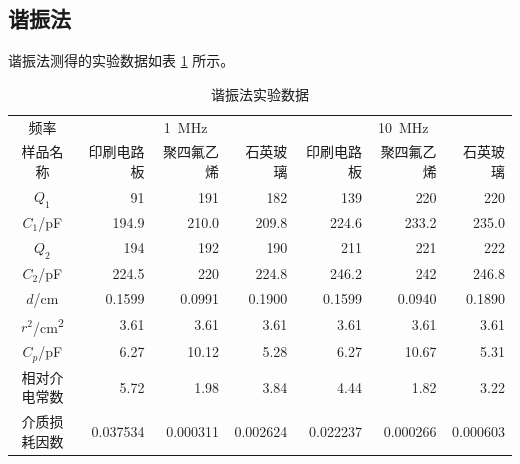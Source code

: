 \subsection{谐振法}
谐振法测得的实验数据如表 \ref{tab:A12.xiezhen} 所示。
\begin{table}[!ht]
    \caption{谐振法实验数据} \label{tab:A12.xiezhen}
    \begin{tabular}{c*{6}{r}} \toprule
        频率 & \multicolumn{3}{c}{\SI{1}{\MHz}} & \multicolumn{3}{c}{\SI{10}{\MHz}} \\
        样品名称 & 印刷电路板 & 聚四氟乙烯 & 石英玻璃 & 印刷电路板 & 聚四氟乙烯 & 石英玻璃 \\ \midrule
        $Q_1$ & 91 & 191 & 182 & 139 & 220 & 220 \\
        $C_1$/\unit{\pF} & 194.9 & 210.0 & 209.8 & 224.6 & 233.2 & 235.0 \\
        $Q_2$ & 194 & 192 & 190 & 211 & 221 & 222 \\
        $C_2$/\unit{\pF} & 224.5 & 220 & 224.8 & 246.2 & 242 & 246.8 \\
        $d$/\unit{\cm} & 0.1599 & 0.0991 & 0.1900 & 0.1599 & 0.0940 & 0.1890 \\
        $r^2$/\unit{\cm^2} & 3.61 & 3.61 & 3.61 & 3.61 & 3.61 & 3.61 \\
        $C_p$/\unit{\pF} & 6.27 & 10.12 & 5.28 & 6.27 & 10.67 & 5.31 \\
        相对介电常数 & 5.72 & 1.98 & 3.84 & 4.44 & 1.82 & 3.22 \\
        介质损耗因数 & 0.037534 & 0.000311 & 0.002624 & 0.022237 & 0.000266 & 0.000603 \\ \bottomrule
    \end{tabular}
\end{table}
